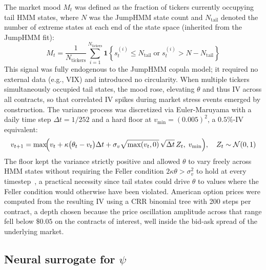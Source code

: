 The market mood $M_t$ was defined as the fraction of tickers currently occupying tail HMM states, where $N$ was the JumpHMM state count and $N_{\text{tail}}$ denoted the number of extreme states at each end of the state space (inherited from the JumpHMM fit):
\begin{equation}\label{eq:mood}
    M_t = \frac{1}{N_{\text{tickers}}} \sum_{i=1}^{N_{\text{tickers}}} \mathbf{1}\!\left\{s_t^{(i)} \leq N_{\text{tail}} \;\text{or}\; s_t^{(i)} > N - N_{\text{tail}}\right\}
\end{equation}
This signal was fully endogenous to the JumpHMM copula model; it required no external data (e.g., VIX) and introduced no circularity. When multiple tickers simultaneously occupied tail states, the mood rose, elevating $\theta$ and thus IV across all contracts, so that correlated IV spikes during market stress events emerged by construction. The variance process was discretized via Euler-Maruyama with a daily time step $\Delta t = 1/252$ and a hard floor at $v_{\min} = (0.005)^2$, a $0.5\%$-IV equivalent:
\begin{equation}\label{eq:euler}
    v_{t+1} = \max\!\Bigl( v_t + \kappa\bigl(\theta_t - v_t\bigr)\Delta t + \sigma_v \sqrt{\max(v_t, 0)}\,\sqrt{\Delta t}\, Z_t,\; v_{\min} \Bigr), \quad Z_t \sim \mathcal{N}(0, 1)
\end{equation}
The floor kept the variance strictly positive and allowed $\theta$ to vary freely across HMM states without requiring the Feller condition $2\kappa\theta > \sigma_v^2$ to hold at every timestep~\cite{andersen2008}, a practical necessity since tail states could drive $\theta$ to values where the Feller condition would otherwise have been violated. American option prices were computed from the resulting IV using a CRR binomial tree with 200 steps per contract, a depth chosen because the price oscillation amplitude across that range fell below $\$0.05$ on the contracts of interest, well inside the bid-ask spread of the underlying market.

\subsection{Neural surrogate for $\psi$}\label{sec:psi_nn}

